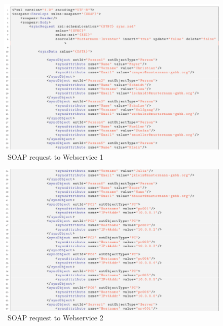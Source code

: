 \documentclass[a4paper,10pt]{book}
\begin{document}
\newline
\begin{figure}[htb!]
  \centering
  \includegraphics[scale=.55]{Screenshot/SyncAPI_Fallstudie_04-en.png}
  \caption{\label{SOAP request to Webservice 1} \ SOAP request to Webservice 1}
\end{figure}
\newline
\begin{figure}[htb!]
  \centering
  \includegraphics[scale=.55]{Screenshot/SyncAPI_Fallstudie_05-en.png}
  \caption{\label{SOAP request to Webservice 2} \ SOAP request to Webservice 2}
\end{figure}
\newline
\end{document}
